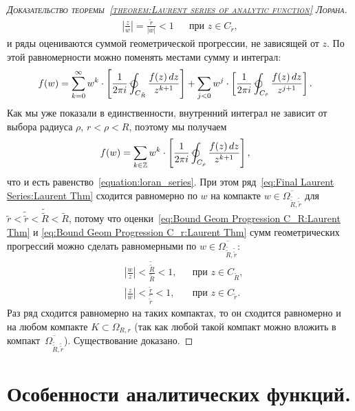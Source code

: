 \documentclass[../complex-analysis.tex]{subfiles}
\begin{document}
\begin{proof}[\normalfont\textsc{Доказательство теоремы~\ref{theorem:Laurent series of analytic function} Лорана}]
\begin{align}
  \label{eq:Bound Geom Progression C_r:Laurent Thm} \left| \frac{z}{w} \right| = \frac{\tilde r}{\left| w \right|} < 1 &&\text{при } z \in C_{\tilde r},
 \end{align} и ряды оцениваются суммой геометрической прогрессии, не зависящей от $ z $. По этой равномерности можно поменять местами сумму и интеграл:
 \begin{align*}
  f(w) &= \sum_{k=0}^{\infty} w^{k} \cdot \left[ \frac{1}{2\pi i} \varointctrclockwise_{C_{\tilde R}} \frac{f(z)\,dz}{z^{k+1}} \right] + \sum_{j < 0} w^{j} \cdot \left[ \frac{1}{2\pi i} \varointctrclockwise_{C_{\tilde r}} \frac{f(z)\,dz}{z^{j+1}} \right].
 \end{align*} Как мы уже показали в единственности, внутренний интеграл не зависит от выбора радиуса $ \rho $, $ r < \rho < R $, поэтому мы получаем 
 \begin{align}
  \label{eq:Final Laurent Series:Laurent Thm}
  f(w) &= \sum_{k \in \Z} w^{k} \cdot \left[ \frac{1}{2\pi i} \varointctrclockwise_{C_\rho} \frac{f(z)\,dz}{z^{k+1}} \right],
 \end{align} что и есть равенство~\eqref{equation:loran_series}. При этом ряд~\eqref{eq:Final Laurent Series:Laurent Thm} сходится равномерно по $ w $ на компакте $ w \in \overline{\Omega_{\tilde {\tilde R}, \tilde {\tilde r}}} $ для $ \tilde r < \tilde{\tilde r} < \tilde{\tilde R} < \tilde R $, потому что оценки~\eqref{eq:Bound Geom Progression C_R:Laurent Thm} и \eqref{eq:Bound Geom Progression C_r:Laurent Thm} сумм геометрических прогрессий можно сделать равномерными по $ w \in \overline{\Omega_{\tilde{\tilde R},\tilde{\tilde r}}} $:
 \begin{align*}
  &\left| \frac{w}{z} \right| < \frac{\tilde {\tilde R}}{\tilde R} < 1, &&\text{при } z \in C_{\tilde R},\\
  &\left| \frac{z}{w} \right| < \frac{\tilde r}{\tilde{\tilde r}} < 1, &&\text{при } z \in C_{\tilde r}.
 \end{align*} Раз ряд сходится равномерно на таких компактах, то он сходится равномерно и на любом компакте $ K \subset \Omega_{R,r} $ (так как любой такой компакт можно вложить в компакт~$ \overline{\Omega_{\tilde{\tilde R}, \tilde{\tilde r}}} $). Существование доказано.
\end{proof}

\newpage
\section{Особенности аналитических функций.}
\label{section:Singularities of Analytic Functions}
\end{document}
